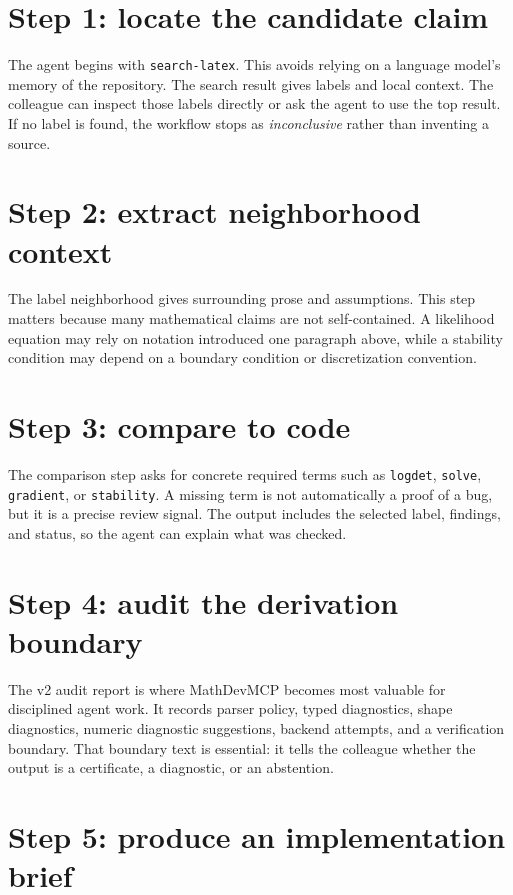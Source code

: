 \documentclass[12pt,a4paper,openany]{book}
\begin{document}
\section{Step 1: locate the candidate claim}

The agent begins with \texttt{search-latex}. This avoids relying on a language
model's memory of the repository. The search result gives labels and local
context. The colleague can inspect those labels directly or ask the agent to use
the top result. If no label is found, the workflow stops as \emph{inconclusive}
rather than inventing a source.

\section{Step 2: extract neighborhood context}

The label neighborhood gives surrounding prose and assumptions. This step
matters because many mathematical claims are not self-contained. A likelihood
equation may rely on notation introduced one paragraph above, while a stability
condition may depend on a boundary condition or discretization convention.

\section{Step 3: compare to code}

The comparison step asks for concrete required terms such as
\texttt{logdet}, \texttt{solve}, \texttt{gradient}, or \texttt{stability}. A
missing term is not automatically a proof of a bug, but it is a precise review
signal. The output includes the selected label, findings, and status, so the
agent can explain what was checked.

\section{Step 4: audit the derivation boundary}

The v2 audit report is where MathDevMCP becomes most valuable for disciplined
agent work. It records parser policy, typed diagnostics, shape diagnostics,
numeric diagnostic suggestions, backend attempts, and a verification boundary.
That boundary text is essential: it tells the colleague whether the output is a
certificate, a diagnostic, or an abstention.

\section{Step 5: produce an implementation brief}
\end{document}

